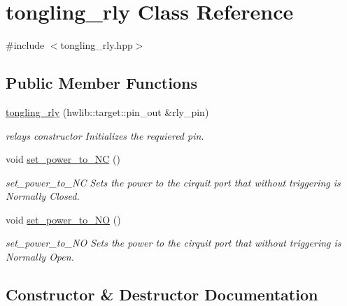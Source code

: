 \hypertarget{classtongling__rly}{}\section{tongling\+\_\+rly Class Reference}
\label{classtongling__rly}


{\ttfamily \#include $<$tongling\+\_\+rly.\+hpp$>$}

\subsection*{Public Member Functions}
\begin{DoxyCompactItemize}
\item 
\hyperlink{classtongling__rly_aa0f512e08ea9468e5730fddb551d59e6}{tongling\+\_\+rly} (hwlib\+::target\+::pin\+\_\+out \&rly\+\_\+pin)
\begin{DoxyCompactList}\small\item\em relays constructor Initializes the requiered pin. \end{DoxyCompactList}\item 
void \hyperlink{classtongling__rly_ae7482fcf1b9d316872e86e17f1a96359}{set\+\_\+power\+\_\+to\+\_\+\+NC} ()
\begin{DoxyCompactList}\small\item\em set\+\_\+power\+\_\+to\+\_\+\+NC Sets the power to the cirquit port that without triggering is Normally Closed. \end{DoxyCompactList}\item 
void \hyperlink{classtongling__rly_a1751d746b187225c18f631d8b2a921e9}{set\+\_\+power\+\_\+to\+\_\+\+NO} ()
\begin{DoxyCompactList}\small\item\em set\+\_\+power\+\_\+to\+\_\+\+NO Sets the power to the cirquit port that without triggering is Normally Open. \end{DoxyCompactList}\end{DoxyCompactItemize}


\subsection{Constructor \& Destructor Documentation}
\mbox{\label{classtongling__rly_aa0f512e08ea9468e5730fddb551d59e6}} 
